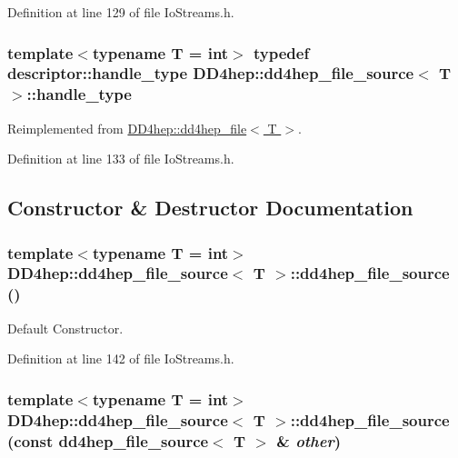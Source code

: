 Definition at line 129 of file IoStreams.h.\hypertarget{class_d_d4hep_1_1dd4hep__file__source_abdabe1da6c2a2b2297dc86f41368c234}{
\subsubsection[{handle\_\-type}]{\setlength{\rightskip}{0pt plus 5cm}template$<$typename T = int$>$ typedef {\bf descriptor::handle\_\-type} {\bf DD4hep::dd4hep\_\-file\_\-source}$<$ {\bf T} $>$::{\bf handle\_\-type}}}
\label{class_d_d4hep_1_1dd4hep__file__source_abdabe1da6c2a2b2297dc86f41368c234}


Reimplemented from \hyperlink{class_d_d4hep_1_1dd4hep__file_a4d79f8d433cd7831ff818691424cd6fc}{DD4hep::dd4hep\_\-file$<$ T $>$}.

Definition at line 133 of file IoStreams.h.

\subsection{Constructor \& Destructor Documentation}
\hypertarget{class_d_d4hep_1_1dd4hep__file__source_a030d8a2563b52d4ea5f206e2d1dbaef5}{
\subsubsection[{dd4hep\_\-file\_\-source}]{\setlength{\rightskip}{0pt plus 5cm}template$<$typename T = int$>$ {\bf DD4hep::dd4hep\_\-file\_\-source}$<$ {\bf T} $>$::{\bf dd4hep\_\-file\_\-source} ()}}
\label{class_d_d4hep_1_1dd4hep__file__source_a030d8a2563b52d4ea5f206e2d1dbaef5}


Default Constructor. 

Definition at line 142 of file IoStreams.h.\hypertarget{class_d_d4hep_1_1dd4hep__file__source_a0f0b058ced88e3e25a3f5ec615ce234b}{
\subsubsection[{dd4hep\_\-file\_\-source}]{\setlength{\rightskip}{0pt plus 5cm}template$<$typename T = int$>$ {\bf DD4hep::dd4hep\_\-file\_\-source}$<$ {\bf T} $>$::{\bf dd4hep\_\-file\_\-source} (const {\bf dd4hep\_\-file\_\-source}$<$ {\bf T} $>$ \& {\em other})}}
\label{class_d_d4hep_1_1dd4hep__file__source_a0f0b058ced88e3e25a3f5ec615ce234b}


